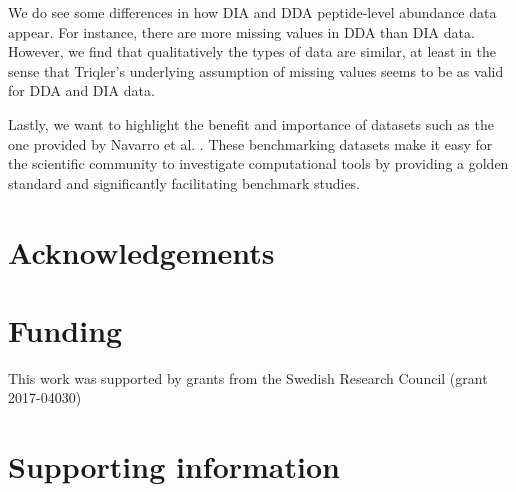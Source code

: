 \documentclass[10pt,letterpaper]{article}
\begin{document}
We do see some differences in how DIA and DDA peptide-level abundance data appear. For instance, there are more missing values in DDA than DIA data. However, we find that qualitatively the types of data are similar, at least in the sense that Triqler's underlying assumption of missing values seems to be as valid for DDA and DIA data.

Lastly, we want to highlight the benefit and importance of datasets such as the one provided by Navarro et al. \cite{navarro2016multicenter}. These benchmarking datasets make it easy for the scientific community to investigate computational tools by providing a golden standard and significantly facilitating benchmark studies. 

\section*{Acknowledgements}


\section*{Funding}

This work was supported by grants from the Swedish Research Council (grant 2017-04030) 

\section*{Supporting information}


%

\end{document}
